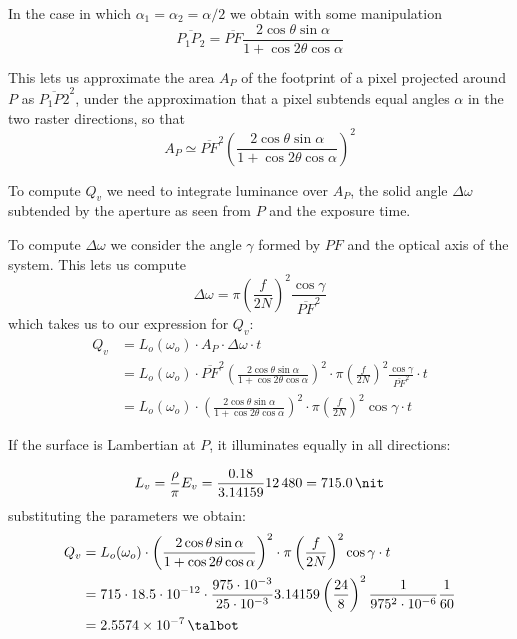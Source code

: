 In the case in which $\alpha_1 = \alpha_2 = \alpha/2$ we obtain with some manipulation
\begin{displaymath}
\overline{P_1P_2} = \overline{PF}
	\frac{2\cos\theta\sin\alpha}{1+\cos2\theta\cos\alpha}
\end{displaymath}


This lets us approximate the area $A_P$ of the footprint of a pixel projected around $P$ as $\overline{P_1P2}^2$, under the approximation that a pixel subtends equal angles $\alpha$ in the two raster directions, so that
\begin{displaymath}
A_P \simeq \overline{PF}^2
    \left( \frac{2\cos\theta\sin\alpha}{1+\cos2\theta\cos\alpha} \right)^2
\end{displaymath}

To compute $Q_v$ we need to integrate luminance over $A_P$,
the solid angle $\Delta\omega$ subtended by the aperture as seen from $P$
and the exposure time.

To compute $\Delta\omega$ we consider the angle $\gamma$ formed by $PF$ and the
optical axis of the system. This lets us compute
\begin{displaymath}
\Delta\omega =  \pi \left(\frac f{2N}\right)^2 \frac{\cos\gamma}{\overline{PF}^2}
\end{displaymath}
which takes us to our expression for $Q_v$:
\begin{align*}
Q_v & = L_o(\omega_o)\cdot A_P \cdot\Delta\omega \cdot t \\
    & = L_o(\omega_o) \cdot \overline{PF}^2
    \left( \frac{2\cos\theta\sin\alpha}{1+\cos2\theta\cos\alpha} \right)^2 \cdot \pi \left(\frac f{2N}\right)^2 \frac {\cos\gamma}{\overline{PF}^2} \cdot t \\
    & = L_o(\omega_o) \cdot \left( \frac{2\cos\theta\sin\alpha}{1+\cos2\theta\cos\alpha} \right)^2 \cdot \pi \left(\frac f{2N}\right)^2 \cos\gamma \cdot t
\end{align*}

If the surface is Lambertian at $P$, it illuminates equally in all directions:

\begin{displaymath}
L_v = \frac\rho\pi E_v = \frac{0.18}{3.14159}12\,480 = \SI{715.0}{\nit}
\end{displaymath}
substituting the parameters we obtain:
\begin{align*}
Q_v & = L_o(\omega_o) \cdot \left( \frac{2\cos\theta\sin\alpha}{1+\cos2\theta\cos\alpha} \right)^2 \cdot \pi \left(\frac f{2N}\right)^2 \cos\gamma \cdot t \\
    & = 715 \cdot 18.5\cdot10^{-12} \cdot \frac{975\cdot10^{-3}}{25\cdot10^{-3}} 3.14159 \left(\frac{24}{8}\right)^2\frac{1}{975^2\cdot 10^{-6}} \frac{1}{60} \\
    & = \SI{2.5574e-7}{\talbot}
\end{align*}

